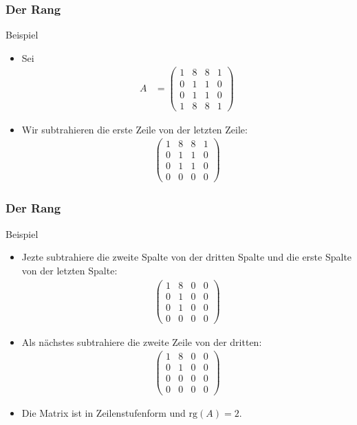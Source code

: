 \documentclass{beamer}
\renewcommand{\ae}{\"a}
\newcommand{\rk}{\mathrm{rg}}
\newcommand{\mytitle}{Der Rang}
\begin{document}
\begin{frame}\frametitle{\mytitle}
	\begin{block}{Beispiel}
	\begin{itemize}
		\item Sei
			\begin{align*}
				A&=\begin{pmatrix}
					1&8&8&1\\
					0&1&1&0\\
					0&1&1&0\\
					1&8&8&1
				\end{pmatrix}
			\end{align*}
		\item Wir subtrahieren die erste Zeile von der letzten Zeile:
\begin{align*}
				\begin{pmatrix}
					1&8&8&1\\
					0&1&1&0\\
					0&1&1&0\\
					0&0&0&0
				\end{pmatrix}
			\end{align*}
	\end{itemize}
	\end{block}
\end{frame}

\begin{frame}\frametitle{\mytitle}
	\begin{block}{Beispiel}
	\begin{itemize}
		\item Jezte subtrahiere die zweite Spalte von der dritten Spalte und die erste Spalte von der letzten Spalte:
\begin{align*}
				\begin{pmatrix}
					1&8&0&0\\
					0&1&0&0\\
					0&1&0&0\\
					0&0&0&0
				\end{pmatrix}
			\end{align*}
		\item Als n\ae chstes subtrahiere die zweite Zeile von der dritten:
			\begin{align*}
				\begin{pmatrix}
					1&8&0&0\\
					0&1&0&0\\
					0&0&0&0\\
					0&0&0&0
				\end{pmatrix}
			\end{align*}
		\item Die Matrix ist in Zeilenstufenform und $\rk(A)=2$.
	\end{itemize}
	\end{block}
\end{frame}
\end{document}
